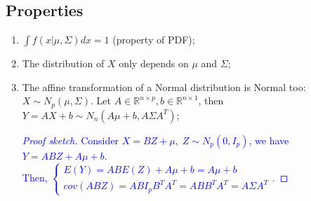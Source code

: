 \documentclass[12pt]{book}
\theoremstyle{definition}
\theoremstyle{remark}
\newcommand{\R}{\mathbb{R}}
\begin{document}
\subsection{Properties}
\begin{enumerate}
\item $\int f(x|\mu, \Sigma) dx = 1$ (property of PDF);
\item The distribution of $X$ only depends on $\mu$ and $\Sigma$;
\item The affine transformation of a Normal distribution is Normal too:\\
$X\sim N_p(\mu, \Sigma)$. Let $A\in \R^{n\times p}, b \in \R^{n\times 1}$, then $Y = AX+b \sim N_n(A\mu+b, A\Sigma A^T)$;\\

\textcolor{blue}{
\begin{proof}[Proof sketch]
Consider $X = BZ+\mu,\; Z\sim N_p(0,I_p)$, we have $Y = ABZ + A\mu+b$.\\
Then, 
$\begin{cases}E(Y)=ABE(Z)+A\mu+b = A\mu+b\\cov(ABZ) = ABI_pB^TA^T = ABB^TA^T = A\Sigma A^T\end{cases}$.
\end{proof}
}


\end{enumerate}
\end{document}
